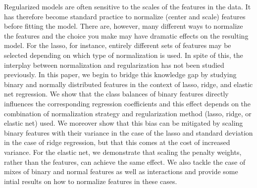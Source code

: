 Regularized models are often sensitive to the scales of the features in the data. It has
therefore become standard practice to normalize (center and scale) features before fitting
the model. There are, however, many different ways to normalize the features and the choice
you make may have dramatic effects on the resulting model. For the lasso, for instance,
entirely different sets of features may be selected depending on which type of
normalization is used. In spite of this, the interplay between normalization and
regularization has not been studied previously. In this paper, we begin to bridge this
knowledge gap by studying binary and normally distributed features in the context of lasso,
ridge, and elastic net regression. We show that the class balances of binary features
directly influences the corresponding regression coefficients and this effect depends on
the combination of normalization strategy and regularization method (lasso, ridge, or
elastic net) used. We moreover show that this bias can be mitigated by scaling binary
features with their variance in the case of the lasso and standard deviation in the case of
ridge regression, but that this comes at the cost of increased variance. For the elastic
net, we demonstrate that scaling the penalty weights, rather than the features, can achieve
the same effect. We also tackle the case of mixes of binary and normal features as well as
interactions and provide some intial results on how to normalize features in these cases.
